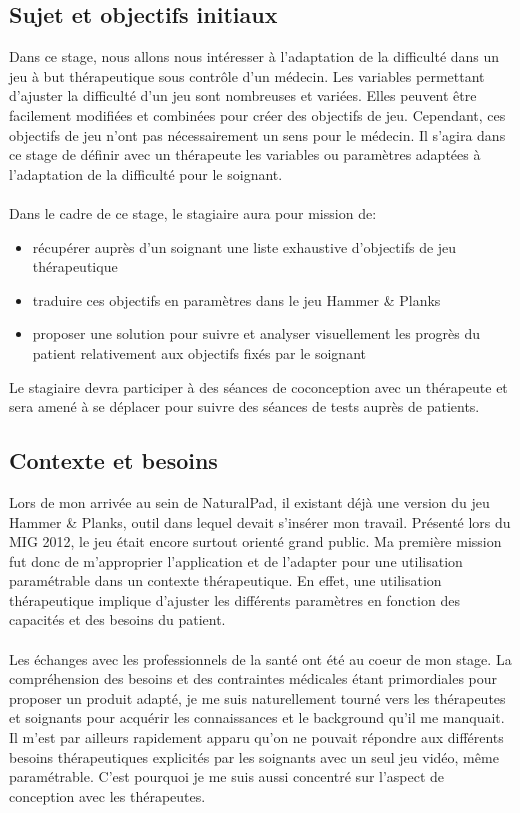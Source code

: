 \subsection{Sujet et objectifs initiaux}
	Dans ce stage, nous allons nous intéresser à l’adaptation de la difficulté dans un jeu à but thérapeutique sous contrôle d’un médecin. Les variables permettant d’ajuster la difficulté d’un jeu sont nombreuses et variées. Elles peuvent être facilement modifiées et combinées pour créer des objectifs de jeu. Cependant, ces objectifs de jeu n’ont pas nécessairement un sens pour le médecin. Il s’agira dans ce stage de définir avec un thérapeute les variables ou paramètres adaptées à l’adaptation de la difficulté pour le soignant.
	\paragraph{}
	Dans le cadre de ce stage, le stagiaire aura pour mission de:
	\begin{itemize}
		\item {récupérer auprès d’un soignant une liste exhaustive d’objectifs de jeu thérapeutique}
		\item {traduire ces objectifs en paramètres dans le jeu Hammer \& Planks}
		\item {proposer une solution pour suivre et analyser visuellement les progrès du patient relativement aux objectifs fixés par le soignant}
	\end{itemize}
	Le stagiaire devra participer à des séances de coconception avec un thérapeute et sera amené à se déplacer pour suivre des séances de tests auprès de patients.
		
\subsection{Contexte et besoins}
Lors de mon arrivée au sein de NaturalPad, il existant déjà une version du jeu Hammer \& Planks, outil dans lequel devait s'insérer mon travail. Présenté lors du MIG 2012, le jeu était encore surtout orienté grand public. Ma première mission fut donc de m'approprier l'application et de l'adapter pour une utilisation paramétrable dans un contexte thérapeutique. En effet, une utilisation thérapeutique implique d'ajuster les différents paramètres en fonction des capacités et des besoins du patient.

	\paragraph{}Les échanges avec les professionnels de la santé ont été au coeur de mon stage. La compréhension des besoins et des contraintes médicales étant primordiales pour proposer un produit adapté, je me suis naturellement tourné vers les thérapeutes et soignants pour acquérir les connaissances et le background qu'il me manquait. Il m'est par ailleurs rapidement apparu qu'on ne pouvait répondre aux différents besoins thérapeutiques explicités par les soignants avec un seul jeu vidéo, même paramétrable. C'est pourquoi je me suis aussi concentré sur l'aspect de conception avec les thérapeutes. 

